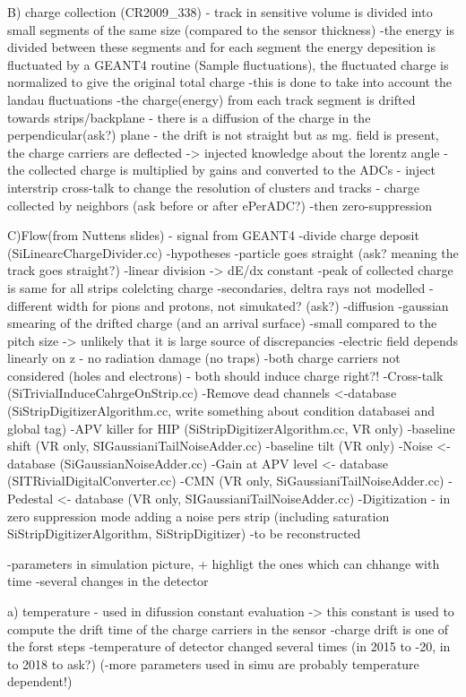 B) charge collection (CR2009\_338)
- track in sensitive volume is divided into small segments of the same size (compared to the sensor thickness)
-the energy is divided between these segments and for each segment the energy depesition is fluctuated by a GEANT4 routine (Sample fluctuations), the fluctuated charge is normalized to give the original total charge
-this is done to take into account the landau fluctuations
-the charge(energy) from each track segment is drifted towards strips/backplane
- there is a diffusion of the charge in the perpendicular(ask?) plane
- the drift is not straight but as mg. field is present, the charge carriers are deflected -> injected knowledge about the lorentz angle
- the collected charge is multiplied by gains and converted to the ADCs
- inject interstrip cross-talk to change the resolution of clusters and tracks - charge collected by neighbors (ask before or after ePerADC?)
-then zero-suppression

C)Flow(from Nuttens slides)
- signal from GEANT4
-divide charge deposit (SiLinearcChargeDivider.cc)
	-hypotheses
	-particle goes straight (ask? meaning the track goes straight?)
	-linear division -> dE/dx constant
	-peak of collected charge is same for all strips colelcting charge
	-secondaries, deltra rays not modelled
        -different width for pions and protons, not simukated? (ask?)
-diffusion
	-gaussian smearing of the drifted charge (and an arrival surface)
	-small compared to the pitch size -> unlikely that it is large source of discrepancies
	-electric field depends linearly on z
	- no radiation damage (no traps)
	-both charge carriers not considered (holes and electrons) - both should induce charge right?!
-Cross-talk (SiTrivialInduceCahrgeOnStrip.cc)
-Remove dead channels <-database (SiStripDigitizerAlgorithm.cc, write something about condition databasei and global tag)
-APV killer for HIP (SiStripDigitizerAlgorithm.cc, VR only)
-baseline shift (VR only, SIGaussianiTailNoiseAdder.cc)
-baseline tilt (VR only)
-Noise <- database (SiGaussianNoiseAdder.cc)
-Gain at APV level <- database (SITRivialDigitalConverter.cc)
-CMN (VR only, SiGaussianiTailNoiseAdder.cc)
-Pedestal <- database (VR only, SIGaussianiTailNoiseAdder.cc)
-Digitization - in zero suppression mode adding a noise pers strip (including saturation SiStripDigitizerAlgorithm, SiStripDigitizer)
-to be reconstructed

-parameters in simulation picture, + highligt the ones which can chhange with time
-several changes in the detector

a) temperature
- used in difussion constant evaluation -> this constant is used to compute the drift time of the charge carriers in the sensor
-charge drift is one of the forst steps
-temperature of detector changed several times (in 2015 to -20, in to 2018 to ask?)
(-more parameters used in simu are probably temperature dependent!)

